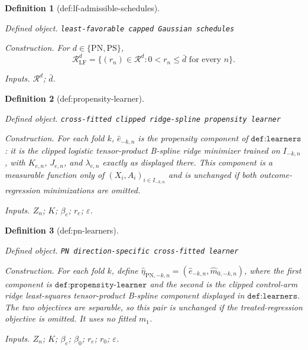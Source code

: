 \documentclass{article}
\newtheorem{definition}{Definition}
\begin{document}
\begin{definition}[def:lf-admissible-schedules]\label{def:lf-admissible-schedules}
\par\smallskip\noindent\emph{Defined object.} \texttt{least-\allowbreak{}favorable capped Gaussian schedules}
\par\smallskip\noindent\emph{Construction.} For \(d\in\{\mathrm{PN},\mathrm{PS}\}\),
\[\mathcal R_{\mathrm{LF}}^d=\{(r_n)\in\mathcal R^d:0<r_n\le\bar d\text{ for every }n\}.\]
\par\smallskip\noindent\emph{Inputs.} \(\mathcal R^d\); \(\bar d\).
\end{definition}

\begin{definition}[def:propensity-learner]\label{def:propensity-learner}
\par\smallskip\noindent\emph{Defined object.} \texttt{cross-\allowbreak{}fitted clipped ridge-\allowbreak{}spline propensity learner}
\par\smallskip\noindent\emph{Construction.} For each fold \(k\), \(\widehat e_{-k,n}\) is the propensity component of \(\texttt{def:learners}\): it is the clipped logistic tensor-product B-spline ridge minimizer trained on \(I_{-k,n}\), with \(K_{e,n}\), \(J_{e,n}\), and \(\lambda_{e,n}\) exactly as displayed there. This component is a measurable function only of \((X_i,A_i)_{i\in I_{-k,n}}\) and is unchanged if both outcome-regression minimizations are omitted.
\par\smallskip\noindent\emph{Inputs.} \(Z_n\); \(K\); \(\beta_e\); \(r_e\); \(\varepsilon\).
\end{definition}

\begin{definition}[def:pn-learners]\label{def:pn-learners}
\par\smallskip\noindent\emph{Defined object.} \texttt{PN direction-\allowbreak{}specific cross-\allowbreak{}fitted learner}
\par\smallskip\noindent\emph{Construction.} For each fold \(k\), define \(\widehat\eta_{\mathrm{PN},-k,n}=(\widehat e_{-k,n},\widehat m_{0,-k,n})\), where the first component is \(\texttt{def:propensity-learner}\) and the second is the clipped control-arm ridge least-squares tensor-product B-spline component displayed in \(\texttt{def:learners}\). The two objectives are separable, so this pair is unchanged if the treated-regression objective is omitted. It uses no fitted \(m_1\).
\par\smallskip\noindent\emph{Inputs.} \(Z_n\); \(K\); \(\beta_e\); \(\beta_0\); \(r_e\); \(r_0\); \(\varepsilon\).
\end{definition}
\end{document}

